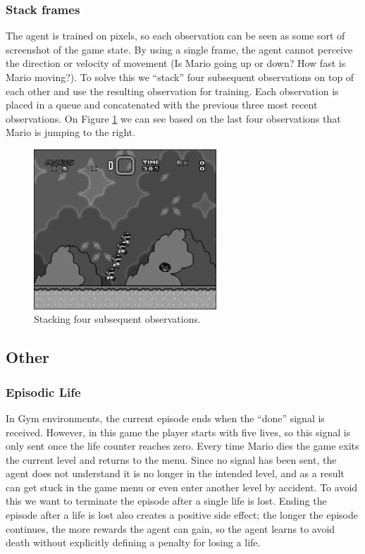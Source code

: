 \documentclass[a4paper]{article}
\begin{document}
\subsubsection{Stack frames}
The agent is trained on pixels, so each observation can be seen as some sort of screenshot of the game state.
By using a single frame, the agent cannot perceive the direction or velocity of movement (Is Mario going up or down? How fast is Mario moving?).
To solve this we ``stack'' four subsequent observations on top of each other and use the resulting observation for training.
Each observation is placed in a queue and concatenated with the previous three most recent observations.
On Figure \ref{fig:stack} we can see based on the last four observations that Mario is jumping to the right.
\begin{figure}[htbp]
    \centering
    \includegraphics[height=6cm]{stacked}
    \caption{Stacking four subsequent observations.}
    \label{fig:stack}
\end{figure}

\subsection{Other}
\subsubsection{Episodic Life}
In Gym environments, the current episode ends when the ``done'' signal is received.
However, in this game the player starts with five lives, so this signal is only sent once the life counter reaches zero.
Every time Mario dies the game exits the current level and returns to the menu.
Since no signal has been sent, the agent does not understand it is no longer in the intended level, and as a result can get stuck in the game menu or even enter another level by accident.
To avoid this we want to terminate the episode after a single life is lost.
Ending the episode after a life is lost also creates a positive side effect; the longer the episode continues, the more rewards the agent can gain, so the agent learns to avoid death without explicitly defining a penalty for losing a life.
\end{document}
